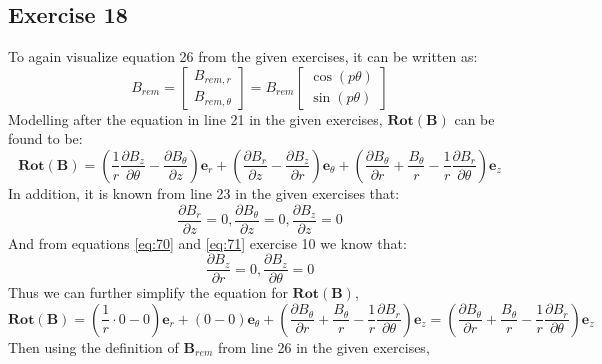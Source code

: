 \documentclass{article}
\begin{document}
\subsection{Exercise 18}
To again visualize equation 26 from the given exercises, it can be written as:
\begin{equation}
    B_{\mathit{rem}}=\left[\begin{array}{c}
B_{\mathit{rem},r} 
\\
 B_{\mathit{rem},\theta} 
\end{array}\right]=B_{\mathit{rem}}\left[\begin{array}{c}
\cos\left(p\mathit{\theta}\right) 
\\
 \sin\left(p\mathit{\theta}\right) 
\end{array}\right]
\end{equation}
Modelling after the equation in line 21 in the given exercises, $\mathbf{Rot(B)}$ can be found to be: 
\begin{equation}
    \mathbf{Rot(B)}=\left(\frac{1}{r}\frac{\partial B_{z}}{\partial \theta}-\frac{\partial B_{\theta}}{\partial z}\right)\mathbf{e}_{r}+\left(\frac{\partial B_{r}}{\partial z}-\frac{\partial B_{z}}{\partial r}\right)\mathbf{e}_{\theta}+\left(\frac{\partial B_{\theta}}{\partial r}+\frac{B_{\theta}}{r}-\frac{1}{r}\frac{\partial B_{r}}{\partial \theta}\right)\mathbf{e}_{z}
\end{equation}
In addition, it is known from line 23 in the given exercises that:
\begin{equation}
   \frac{\partial B_{r}}{\partial z}=0,\frac{\partial B_{\theta}}{\partial z}=0,\frac{\partial B_{z}}{\partial z}=0 
\end{equation}
And from equations \ref{eq:70} and \ref{eq:71} exercise 10 we know that:
\begin{equation}
    \frac{\partial B_{z}}{\partial r}=0,\frac{\partial B_{z}}{\partial \theta}=0
\end{equation}
Thus we can further simplify the equation for $\mathbf{Rot(B)}$,
\begin{equation}
   \mathbf{Rot(B)}= \left(\frac{1}{r}\cdot 0-0\right)\mathbf{e}_{r}+\left(0-0\right)\mathbf{e}_{\theta}+\left(\frac{\partial B_{\theta}}{\partial r}+\frac{B_{\theta}}{r}-\frac{1}{r}\frac{\partial B_{r}}{\partial \theta}\right)\mathbf{e}_{z}=\left(\frac{\partial B_{\theta}}{\partial r}+\frac{B_{\theta}}{r}-\frac{1}{r}\frac{\partial B_{r}}{\partial \theta}\right)\mathbf{e}_{z}
\end{equation}
Then using the definition of $\mathbf{B}_{rem}$ from line 26 in the given exercises,
\end{document}
